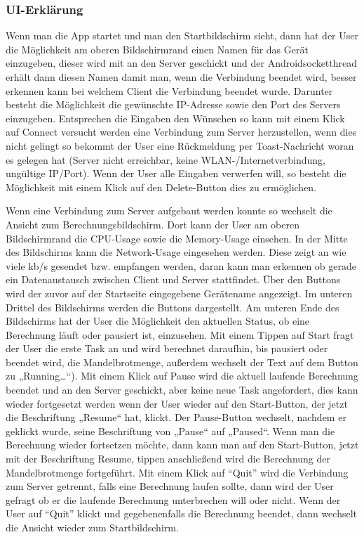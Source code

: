 \documentclass[12pt, onecolumn,notitlepage]{scrartcl}
\begin{document}
\subsubsection{UI-Erklärung}
Wenn man die App startet und man den Startbildschirm  sieht, dann hat der User die Möglichkeit am oberen Bildschirmrand einen Namen für das Gerät einzugeben, dieser wird mit an den Server geschickt und der Androidsocketthread erhält dann diesen Namen damit man, wenn die Verbindung beendet wird, besser erkennen kann bei welchem Client die Verbindung beendet wurde. Darunter besteht die Möglichkeit die gewünschte IP-Adresse  sowie den Port  des Servers einzugeben. Entsprechen die Eingaben den Wünschen so kann mit einem Klick auf Connect   versucht werden eine Verbindung zum Server herzustellen, wenn dies nicht gelingt so bekommt der User eine Rückmeldung per Toast-Nachricht woran es gelegen hat (Server nicht erreichbar, keine WLAN-/Internetverbindung, ungültige IP/Port). Wenn der User alle Eingaben verwerfen will, so besteht die Möglichkeit mit einem Klick auf den Delete-Button  dies zu ermöglichen. \par
Wenn eine Verbindung zum Server aufgebaut werden konnte so wechselt die Ansicht zum Berechnungsbildschirm. Dort kann der User am oberen Bildschirmrand die CPU-Usage sowie die Memory-Usage einsehen. In der Mitte des Bildschirms kann die Network-Usage  eingesehen werden. Diese zeigt an wie viele kb/s gesendet bzw. empfangen werden, daran kann man erkennen ob gerade ein Datenaustausch zwischen Client und Server stattfindet. Über den Buttons wird der zuvor auf der Startseite eingegebene Gerätename angezeigt. Im unteren Drittel des Bildschirms werden die Buttons dargestellt. Am unteren Ende des Bildschirms hat der User die Möglichkeit den aktuellen Status, ob eine Berechnung läuft oder pausiert ist, einzusehen. Mit einem Tippen auf Start fragt der User die erste Task an und wird berechnet daraufhin, bis pausiert oder beendet wird, die Mandelbrotmenge, außerdem wechselt der Text auf dem Button zu „Running…“). Mit einem Klick auf Pause wird die aktuell laufende Berechnung beendet und an den Server geschickt, aber keine neue Task angefordert, dies kann wieder fortgesetzt werden wenn der User wieder auf den Start-Button, der jetzt die Beschriftung „Resume“ hat, klickt. Der Pause-Button wechselt, nachdem er geklickt wurde, seine Beschriftung von „Pause“ auf „Paused“. Wenn man die Berechnung wieder fortsetzen möchte, dann kann man auf den Start-Button, jetzt mit der Beschriftung Resume, tippen anschließend wird die Berechnung der Mandelbrotmenge fortgeführt. Mit einem Klick auf \enquote{Quit} wird die Verbindung zum Server getrennt, falls eine Berechnung laufen sollte, dann wird der User gefragt ob er die laufende Berechnung unterbrechen will oder nicht. Wenn der User auf \enquote{Quit} klickt und gegebenenfalls die Berechnung beendet, dann wechselt die Ansicht wieder zum Startbildschirm.
\end{document}
